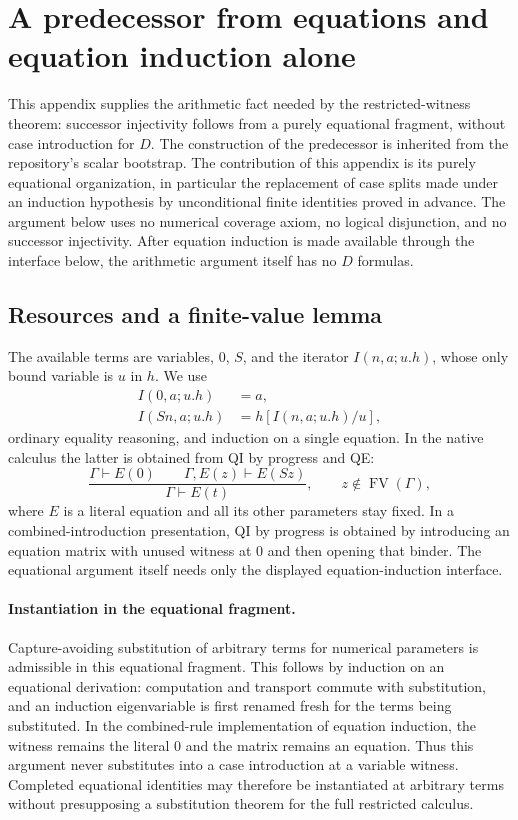 \section{A predecessor from equations and equation induction alone}
\label{app:pure-equational-predecessor}

This appendix supplies the arithmetic fact needed by the restricted-witness
theorem: successor injectivity follows from a purely equational fragment,
without case introduction for $D$.  The construction of the predecessor is inherited
from the repository's scalar bootstrap.  The contribution of this appendix
is its purely equational organization, in particular the replacement of
case splits made under an induction hypothesis by unconditional finite
identities proved in advance.  The argument below uses no numerical
coverage axiom, no logical disjunction, and no successor injectivity.
After equation induction is made available through the interface below,
the arithmetic argument itself has no $D$ formulas.

\subsection{Resources and a finite-value lemma}

The available terms are variables, $0$, $S$, and the iterator
$I(n,a;u.h)$, whose only bound variable is $u$ in $h$.  We use
\begin{align}
 I(0,a;u.h)&=a, \label{eq:pe-zero}\\
 I(Sn,a;u.h)&=h[I(n,a;u.h)/u], \label{eq:pe-succ}
\end{align}
ordinary equality reasoning, and induction on a single equation.  In the
native calculus the latter is obtained from QI by progress and QE:
\[
 \frac{\Gamma\vdash E(0)\qquad
       \Gamma,E(z)\vdash E(Sz)}{\Gamma\vdash E(t)},
 \qquad z\notin\operatorname{FV}(\Gamma),
\]
where $E$ is a literal equation and all its other parameters stay fixed.
In a combined-introduction presentation, QI by progress is obtained by
introducing an equation matrix with unused witness at $0$ and then opening
that binder.  The equational argument itself needs only the displayed
equation-induction interface.

\paragraph{Instantiation in the equational fragment.}
Capture-avoiding substitution of arbitrary terms for numerical parameters
is admissible in this equational fragment.  This follows by induction on
an equational derivation: computation and transport commute with
substitution, and an induction eigenvariable is first renamed fresh for
the terms being substituted.  In the combined-rule implementation of
equation induction, the witness remains the literal $0$ and the matrix
remains an equation.  Thus this argument never substitutes into a case
introduction at a variable witness.  Completed equational identities may
therefore be instantiated at arbitrary terms without presupposing a
substitution theorem for the full restricted calculus.

